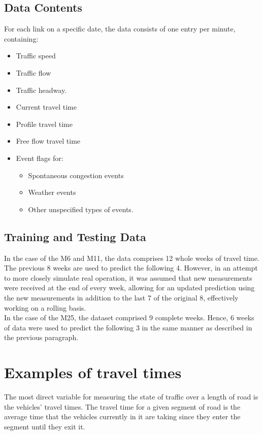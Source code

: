 \documentclass[conference]{IEEEtran}
\begin{document}
\subsection{Data Contents}
For each link on a specific date, the data consists of one entry per minute, containing:
\begin{itemize}
	\item Traffic speed
	\item Traffic flow
	\item Traffic headway.
	\item Current travel time
	\item Profile travel time 
	\item Free flow travel time
	\item Event flags for:
	\begin{itemize}
		\item Spontaneous congestion events
		\item Weather events 
		\item Other unspecified types of events.
	\end{itemize} 	
\end{itemize}

\subsection{Training and Testing Data}
In the case of the M6 and M11, the data comprises 12 whole weeks of travel time. The previous 8 weeks are used to predict the following 4. 
However, in an attempt to more closely simulate real operation, it was assumed that new measurements were received at the end of every week, allowing for an updated prediction using the new measurements in addition to the last 7 of the original 8, effectively working on a rolling basis.\\
In the case of the M25, the dataset comprised 9 complete weeks. 
Hence, 6 weeks of data were used to predict the following 3 in the same manner as described in the previous paragraph.

\section{Examples of travel times} 
The most direct variable for measuring the state of traffic over a length of road is the vehicles' travel times. 
The travel time for a given segment of road is the average time that the vehicles currently in it are taking since they enter the segment until they exit it.\\
\end{document}
